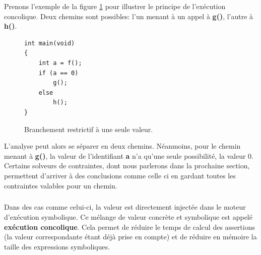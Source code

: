 Prenons l'exemple de la figure \ref{fig:condition} pour illustrer le principe de l'exécution concolique. Deux chemins sont possibles: l'un menant à un appel à \textbf{g()}, l'autre à \textbf{h()}.
\begin{figure}[h]
    \centering
    \begin {lstlisting}[frame=single]
int main(void)
{
    int a = f();
    if (a == 0)
        g();
    else
        h();
}
    \end{lstlisting}
    \caption{Branchement restrictif à une seule valeur.}
    \label{fig:condition}
\end{figure}
L'analyse peut alors se séparer en deux chemins. Néanmoins, pour le chemin menant à \textbf{g()}, la valeur de l'identifiant \textbf{a}
n'a qu'une seule possibilité, la valeur 0. Certains solveurs de contraintes, dont nous parlerons dans la prochaine section, permettent d'arriver
à des conclusions comme celle ci en gardant toutes les contraintes valables pour un chemin.
\subparagraph{}
Dans des cas comme celui-ci, la valeur est directement injectée dans le moteur d'exécution symbolique. Ce mélange de valeur concrète et symbolique est
appelé \textbf{exécution concolique}. Cela permet de réduire le temps de calcul des assertions (la valeur correspondante étant déjà prise en compte) et de
réduire en mémoire la taille des expressions symboliques.


